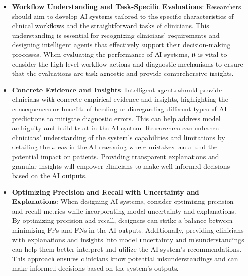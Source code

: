 \begin{itemize}

\item \textbf{Workflow Understanding and Task-Specific Evaluations}:
Researchers should aim to develop \ac{AI} systems tailored to the specific characteristics of clinical workflows and the straightforward tasks of clinicians.
This understanding is essential for recognizing clinicians' requirements and designing intelligent agents that effectively support their decision-making processes.
When evaluating the performance of \ac{AI} systems, it is vital to consider the high-level workflow actions and diagnostic mechanisms to ensure that the evaluations are task agnostic and provide comprehensive insights.

\vspace{0.025mm}

\item \textbf{Concrete Evidence and Insights}:
Intelligent agents should provide clinicians with concrete empirical evidence and insights, highlighting the consequences or benefits of heeding or disregarding different types of \ac{AI} predictions to mitigate diagnostic errors.
This can help address model ambiguity and build trust in the \ac{AI} system.
Researchers can enhance clinicians' understanding of the system's capabilities and limitations by detailing the areas in the \ac{AI} reasoning where mistakes occur and the potential impact on patients.
Providing transparent explanations and granular insights will empower clinicians to make well-informed decisions based on the \ac{AI} outputs.

\vspace{0.025mm}

\item \textbf{Optimizing Precision and Recall with Uncertainty and Explanations}:
When designing \ac{AI} systems, consider optimizing precision and recall metrics while incorporating model uncertainty and explanations.
By optimizing precision and recall, designers can strike a balance between minimizing \acp{FP} and \acp{FN} in the \ac{AI} outputs.
Additionally, providing clinicians with explanations and insights into model uncertainty and misunderstandings can help them better interpret and utilize the \ac{AI} system's recommendations.
This approach ensures clinicians know potential misunderstandings and can make informed decisions based on the system's outputs.

\end{itemize}

